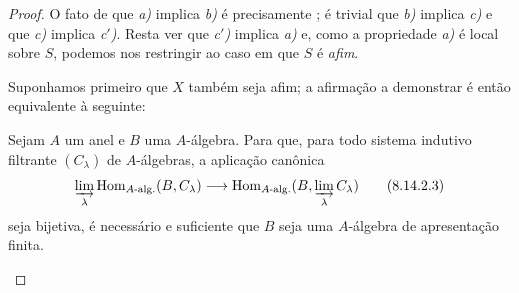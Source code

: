 \begin{proof}
O fato de que \emph{a)} implica \emph{b)} é precisamente ; é trivial que \emph{b)} implica \emph{c)} e que \emph{c)} implica \emph{c$'$)}.
Resta ver que \emph{c$'$)} implica \emph{a)} e, como a propriedade \emph{a)} é local sobre $S$, podemos nos restringir ao caso em que $S$ é \emph{afim}.

Suponhamos primeiro que $X$ também seja afim; a afirmação a demonstrar é então equivalente à seguinte:

\begin{corollary}[8.14.2.2]
\label{IV.8.14.2.2}
Sejam $A$ um anel e $B$ uma $A$-álgebra.
Para que, para todo sistema indutivo filtrante $(C_\lambda)$ de $A$-álgebras, a aplicação canônica
\begin{equation}
\label{IV.8.14.2.3}
\varinjlim_\lambda\operatorname{Hom}_{A\text{-}\mathrm{alg.}}(B,C_\lambda)\to\operatorname{Hom}_{A\text{-}\mathrm{alg.}}(B,\varinjlim_\lambda C_\lambda) \tag{8.14.2.3}
\end{equation}
seja bijetiva, é necessário e suficiente que $B$ seja uma $A$-álgebra de apresentação finita.
\end{corollary}


\end{proof}
